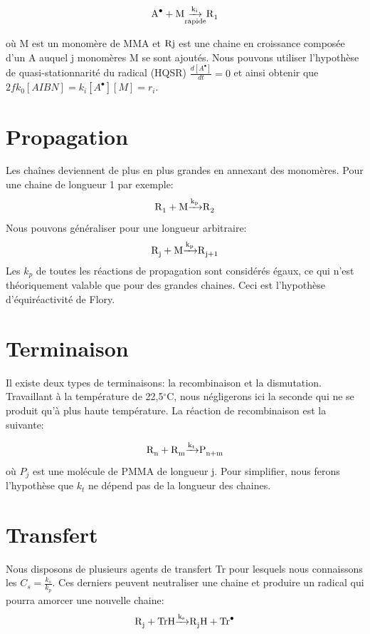 \documentclass[a4paper,oneside,12pt]{article}
\begin{document}
\begin{equation}
\ce{A^{\bullet} + M \underset{rapide}{\xrightarrow{k_i}} R1} 
\end{equation}

où M est un monomère de MMA et $\ce{Rj}$ est une chaine en croissance composée d'un A auquel j monomères M se sont ajoutés. Nous pouvons utiliser l'hypothèse de quasi-stationnarité du radical (HQSR) $\frac{d[A^{\bullet}]}{dt}=0$ et ainsi obtenir que $2fk_{0}[AIBN]=k_{i}[A^{\bullet}][M]=r_i$.

\section{Propagation}
Les chaînes deviennent de plus en plus grandes en annexant des monomères. Pour une chaine de longueur 1 par exemple:
\begin{equation}
\ce{R1 + M \xrightarrow{k_p} R2}
\end{equation}
Nous pouvons généraliser pour une longueur arbitraire:
\begin{equation}
\ce{R_{j} + M \xrightarrow{k_p} R_{j+1}}
\end{equation}
Les $k_{p}$ de toutes les réactions de propagation sont considérés égaux, ce qui n'est théoriquement valable que pour des grandes chaines. Ceci est l'hypothèse d'équiréactivité de Flory.

\section{Terminaison}
Il existe deux types de terminaisons: la recombinaison et la dismutation. Travaillant à la température de 22,5$^{\circ}$C, nous négligerons ici la seconde qui ne se produit qu'à plus haute température. La réaction de recombinaison est la suivante:

\begin{equation}
\ce{R_{n} + R_{m} \xrightarrow{k_t} P_{n+m}}
\end{equation}
où $P_{j}$ est une molécule de PMMA de longueur j. Pour simplifier, nous ferons l'hypothèse que $k_{t}$ ne dépend pas de la longueur des chaines.

\section{Transfert}
Nous disposons de plusieurs agents de transfert Tr pour lesquels nous connaissons les $C_{s}=\frac{k_{s}}{k_{p}}$. Ces derniers peuvent neutraliser une chaine et produire un radical qui pourra amorcer une nouvelle chaine:
\begin{equation}
\ce{R_{j} + TrH \xrightarrow{k_s} R_{j}H + Tr^{\bullet}}
\end{equation}
\end{document}
